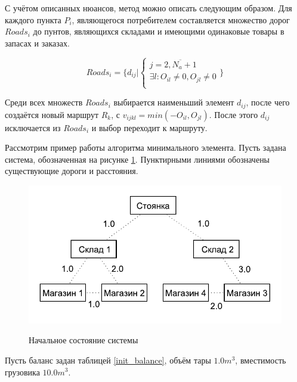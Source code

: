 	С учётом описанных нюансов, метод можно описать следующим образом. Для каждого пункта $P_i$, являющегося потребителем составляется множество дорог $Roads_i$ до пунтов, являющихся складами и имеющими одинаковые товары в запасах и заказах.
	
	\begin{equation}
		\label{roads}
		Roads_i = \{
			d_{ij} 
			| 
			\left\{ \begin{array}{ccc}	
				j = \overline{2, N_a + 1} \\
				\exists l: O_{il} \ne 0, O_{jl} \ne 0\\
			\end{array}	\right.
		\}
	\end{equation}

	Среди всех множеств $Roads_i$ выбирается наименьший элемент $d_{ij}$, после чего создаётся новый маршрут $R_k$, с $v_{ijkl} = min(-O_{il}, O_{jl})$. После этого $d_{ij}$ исключается из $Roads_i$ и выбор переходит к маршруту.
	
	Рассмотрим пример работы алгоритма минимального элемента. Пусть задана система, обозначенная на рисунке \ref{pic:pre_1}. Пунктирными линиями обозначены существующие дороги и расстояния.
	
	\begin{figure}[h!] 
		\begin{center}
			{\includegraphics[scale=1.0, angle=0]{img/max_elem_1.pdf}}
			\caption{Начальное состояние системы}
			\label{pic:pre_1}
		\end{center}
	\end{figure}

	Пусть баланс задан таблицей \ref{init_balance}, объём тары $1.0 m^3$, вместимость грузовика $10.0 m^3$.
	
